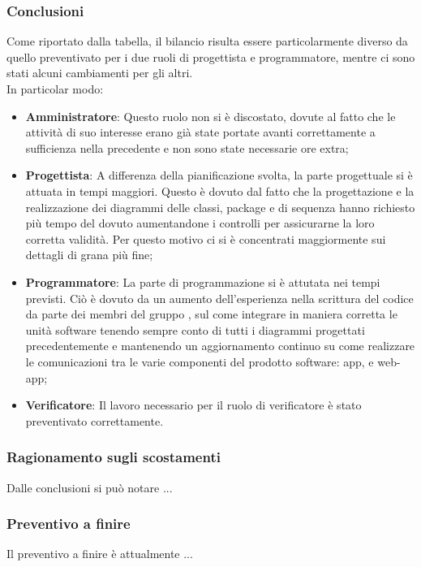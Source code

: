 \subsubsection{Conclusioni}
Come riportato dalla tabella, il bilancio risulta essere particolarmente diverso da quello preventivato per i due ruoli di progettista e programmatore, mentre ci sono stati alcuni cambiamenti per gli altri.\\
In particolar modo:
\begin{itemize}
	\item \textbf{Amministratore}: Questo ruolo non si è discostato, dovute al fatto che le attività di suo interesse erano già state portate avanti correttamente a sufficienza nella precedente  e non sono state necessarie ore extra;
    \item \textbf{Progettista}: A differenza della pianificazione svolta, la parte progettuale si è attuata in tempi maggiori. Questo è dovuto dal fatto che la progettazione e la 
    realizzazione dei diagrammi delle classi, package e di sequenza hanno richiesto più tempo del dovuto aumentandone i controlli per assicurarne la loro corretta validità.
	Per questo motivo ci si è concentrati maggiormente sui dettagli di grana più fine;
    \item \textbf{Programmatore}: La parte di programmazione si è attutata nei tempi previsti. Ciò è dovuto da un aumento dell'esperienza nella scrittura del codice da parte dei 
    membri del gruppo \Gruppo{}, sul come integrare in maniera corretta le unità software tenendo sempre conto di tutti i diagrammi progettati precedentemente e mantenendo
    un aggiornamento continuo su come realizzare le comunicazioni tra le varie componenti del prodotto software: app,  e web-app;
	\item \textbf{Verificatore}: Il lavoro necessario per il ruolo di verificatore è stato preventivato correttamente. 
\end{itemize}
\subsubsection{Ragionamento sugli scostamenti}
Dalle conclusioni si può notare ...


\subsubsection{Preventivo a finire}
Il preventivo a finire è attualmente ...